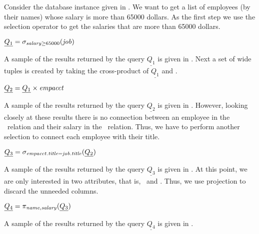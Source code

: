 \begin{example}
\label{eg:ra}
Consider the database instance given in . We want to get a list
of employees (by their names) whose salary is more than 65000 dollars. 
As the first step we use the selection operator to get the salaries that 
are more than 65000 dollars.\\
%
\centerline{
\ensuremath{
\underline{Q_1} = \sigma_{\salary \ge 65000} (\job)
}}
%
\noindent
A sample of the results returned by the query $\underline{Q_1}$ is given in .
Next a set of wide tuples is created by taking the cross-product of $\underline{Q_1}$
and \empacct.\\
%
\centerline{
\ensuremath{
\underline{Q_2} = \underline{Q_1} \times \empacct
}}
%
\noindent
A sample of the results returned by the query $\underline{Q_2}$ is given in .
However, looking closely at these results there is no connection between an employee
in the \empacct\ relation and their salary in the \job\ relation. Thus, we have to perform 
another selection to connect each employee with their title. \\
%
\centerline{
\ensuremath{
\underline{Q_3} = \sigma_{\empacct.\titleatt=\job.\titleatt} (\underline{Q_2})
}}
%
\noindent
A sample of the results returned by the query $\underline{Q_3}$ is given in .
At this point, we are only interested in two attributes, that is, \name\ and \salary.
Thus, we use projection to discard the unneeded columns.\\
%
\centerline{
\ensuremath{
\underline{Q_4} = \pi_{\name, \salary} (\underline{Q_3} )
}}
%
A sample of the results returned by the query $\underline{Q_4}$ is given in .
\end{example}



